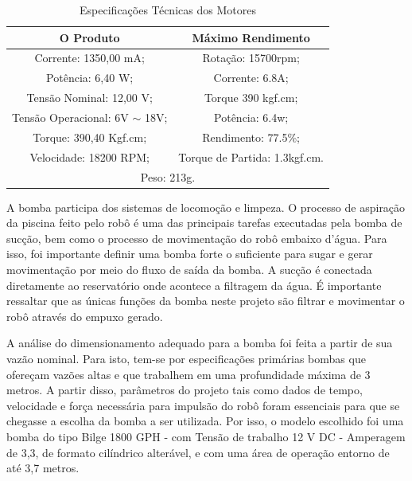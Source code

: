 \begin{table}[h]
\centering
\caption{Especificações Técnicas dos Motores}
\label{tab:spec-engine}
\begin{tabular}{@{}cc@{}}
\toprule
\textbf{O Produto}                 & \textbf{Máximo Rendimento}    \\ \midrule
Corrente: 1350,00 mA;              & Rotação: 15700rpm;            \\
Potência: 6,40 W;                  & Corrente: 6.8A;               \\
Tensão Nominal: 12,00 V;           & Torque 390 kgf.cm;            \\
Tensão Operacional: 6V $\sim$ 18V; & Potência: 6.4w;               \\
Torque: 390,40 Kgf.cm;             & Rendimento: 77.5\%;           \\
Velocidade: 18200 RPM;             & Torque de Partida: 1.3kgf.cm. \\
\multicolumn{2}{c}{Peso: 213g.}                                    \\ \bottomrule
\end{tabular}
\end{table}

A bomba participa dos  sistemas de locomoção e limpeza. O processo de aspiração da piscina feito pelo robô é uma das principais tarefas executadas pela bomba de sucção, bem como o processo de movimentação do robô embaixo d’água. Para isso, foi importante definir uma bomba forte o suficiente para sugar e gerar movimentação por meio do fluxo de saída da bomba. A sucção é conectada diretamente ao reservatório onde acontece a filtragem da água. É importante ressaltar que as únicas funções da bomba neste projeto são filtrar e movimentar o robô através do empuxo gerado.

A análise do dimensionamento adequado para a bomba foi feita a partir de sua vazão nominal. Para isto, tem-se por especificações primárias bombas que ofereçam vazões altas e que trabalhem em uma profundidade máxima de 3 metros. A partir disso,  parâmetros do projeto tais como dados de tempo, velocidade e força necessária para impulsão do robô foram essenciais para que se chegasse a escolha da bomba a ser utilizada. Por isso, o modelo escolhido foi uma bomba do tipo Bilge 1800 GPH - com Tensão de trabalho 12 V DC - Amperagem de 3,3, de formato cilíndrico alterável, e com uma área de operação entorno de até 3,7 metros.

